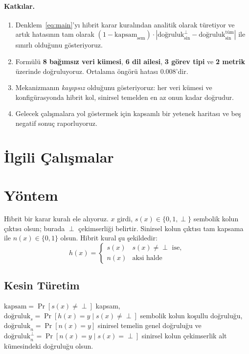 \documentclass[11pt,a4paper]{article}
\begin{document}
\paragraph{Katkılar.}
\begin{enumerate}
\item Denklem~\ref{eq:main}'yı hibrit karar kuralından analitik olarak
türetiyor ve artık hatasının tam olarak
$(1-\text{kapsam}_{\text{sem}}) \cdot
|\text{doğruluk}_{\text{sin}}^{\perp} -
\text{doğruluk}_{\text{sin}}^{\text{tüm}}|$ ile sınırlı olduğunu
gösteriyoruz.
\item Formülü \textbf{8 bağımsız veri kümesi}, \textbf{6 dil ailesi},
\textbf{3 görev tipi} ve \textbf{2 metrik} üzerinde doğruluyoruz.
Ortalama öngörü hatası $0.008$'dir.
\item Mekanizmanın \emph{kayıpsız} olduğunu gösteriyoruz: her veri
kümesi ve konfigürasyonda hibrit kol, sinirsel temelden en az onun
kadar doğrudur.
\item Gelecek çalışmalara yol göstermek için kapsamlı bir yetenek
haritası ve beş negatif sonuç raporluyoruz.
\end{enumerate}

\section{İlgili Çalışmalar}
\label{sec:ilgili}


\section{Yöntem}
\label{sec:yontem}
Hibrit bir karar kuralı ele alıyoruz. $x$ girdi,
$s(x) \in \{0,1,\perp\}$ sembolik kolun çıktısı olsun; burada $\perp$
çekimserliği belirtir. Sinirsel kolun çıktısı tam kapsama ile
$n(x) \in \{0,1\}$ olsun. Hibrit kural şu şekildedir:
\begin{equation}
h(x) =
\begin{cases}
s(x) & s(x) \neq \perp \text{ ise}, \\
n(x) & \text{aksi halde}
\end{cases}
\end{equation}

\subsection{Kesin Türetim}
$\text{kapsam} = \Pr[s(x) \neq \perp]$ kapsam,
$\text{doğruluk}_s = \Pr[h(x) = y \mid s(x) \neq \perp]$ sembolik
kolun koşullu doğruluğu, $\text{doğruluk}_n = \Pr[n(x) = y]$ sinirsel
temelin genel doğruluğu ve
$\text{doğruluk}_n^{\perp} = \Pr[n(x) = y \mid s(x) = \perp]$
sinirsel kolun çekimserlik alt kümesindeki doğruluğu olsun.
\end{document}
